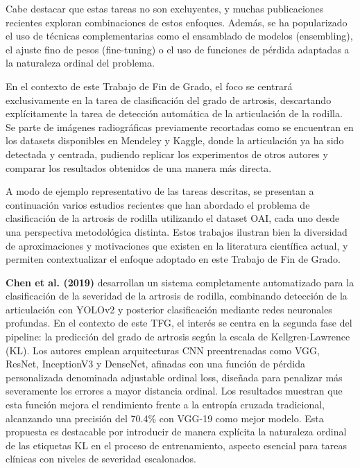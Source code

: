 \documentclass[11pt,spanish,listoffigures,listoftables]{tfgetsinf}
\begin{document}
Cabe destacar que estas tareas no son excluyentes, y muchas publicaciones recientes exploran combinaciones de estos enfoques. Además, se ha popularizado el uso de técnicas complementarias 
como el ensamblado de modelos (ensembling), el ajuste fino de pesos (fine-tuning) o el uso de funciones de pérdida adaptadas a la naturaleza ordinal del problema.

En el contexto de este Trabajo de Fin de Grado, el foco se centrará exclusivamente en la tarea de clasificación del grado de artrosis, descartando explícitamente la tarea de detección automática de 
la articulación de la rodilla. Se parte de imágenes radiográficas previamente recortadas como se encuentran en los datasets disponibles en Mendeley y Kaggle, donde la articulación ya ha sido
detectada y centrada, pudiendo replicar los experimentos de otros autores y comparar los resultados obtenidos de una manera más directa. 

A modo de ejemplo representativo de las tareas descritas, se presentan a continuación varios estudios recientes que han abordado el problema de clasificación de la artrosis de 
rodilla utilizando el dataset OAI, cada uno desde una perspectiva metodológica distinta. Estos trabajos ilustran bien la diversidad de aproximaciones y motivaciones que existen 
en la literatura científica actual, y permiten contextualizar el enfoque adoptado en este Trabajo de Fin de Grado.

\textbf{Chen et al. (2019)} \cite{chen2019fully} desarrollan un sistema completamente automatizado para la clasificación de la severidad de la 
artrosis de rodilla, combinando detección de la articulación con YOLOv2 y posterior clasificación mediante redes neuronales profundas. 
En el contexto de este TFG, el interés se centra en la segunda fase del pipeline: la predicción del grado de artrosis según la escala de 
Kellgren-Lawrence (KL). Los autores emplean arquitecturas CNN preentrenadas como VGG, ResNet, InceptionV3 y DenseNet, afinadas con una función de 
pérdida personalizada denominada adjustable ordinal loss, diseñada para penalizar más severamente los errores a mayor distancia ordinal. 
Los resultados muestran que esta función mejora el rendimiento frente a la entropía cruzada tradicional, alcanzando una precisión del 70.4\% con 
VGG-19 como mejor modelo. Esta propuesta es destacable por introducir de manera explícita la naturaleza ordinal de las etiquetas KL en el proceso 
de entrenamiento, aspecto esencial para tareas clínicas con niveles de severidad escalonados.
\end{document}
